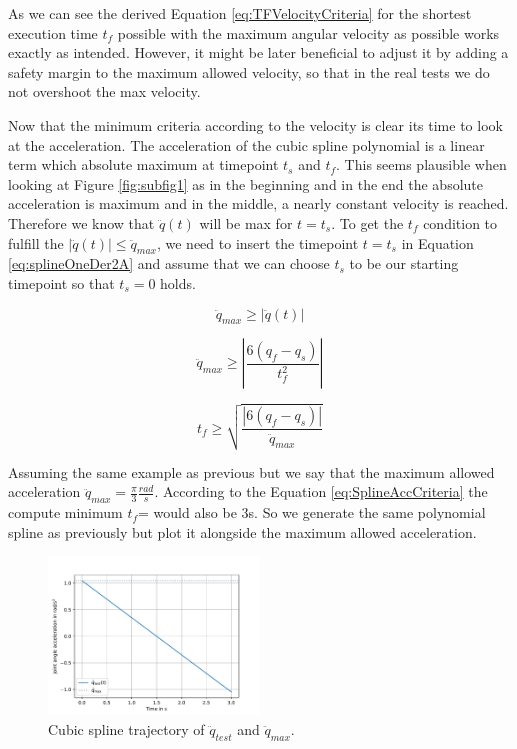 As we can see the derived Equation \ref{eq:TFVelocityCriteria} for the shortest execution time $t_f$ possible with the maximum angular velocity as possible works exactly as intended. However, it might be later beneficial to adjust it by adding a safety margin to the maximum allowed velocity, so that in the real tests we do not overshoot the max velocity. 
\newline

Now that the minimum criteria according to the velocity is clear its time to look at the acceleration. The acceleration of the cubic spline polynomial is a linear term which absolute maximum at timepoint $t_s$ and $t_f$. This seems plausible when looking at Figure \ref{fig:subfig1} as in the beginning and in the end the absolute acceleration is maximum and in the middle, a nearly constant velocity is reached. Therefore we know that $\ddot{q}(t)$ will be max for $t=t_s$. To get the $t_f$ condition to fulfill the $|\ddot{q}(t)| \leq \ddot{q}_{max}$, we need to insert the timepoint $t=t_s$ in Equation \ref{eq:splineOneDer2A} and assume that we can choose $t_s$ to be our starting timepoint so that $t_s=0$ holds.

\begin{equation}
    \ddot{q}_{max} \geq  |\ddot{q}(t)|
\end{equation}

\begin{equation}
    \ddot{q}_{max} \geq |\frac{6(q_{f}-q_{s})}{t_{f}^2}|
    \label{eq:splineOneDerAtMax}
\end{equation}

\begin{equation}
    t_f \geq \sqrt{\frac{|6(q_{f}-q_{s})|}{\ddot{q}_{max}}}
    \label{eq:SplineAccCriteria}
\end{equation}

Assuming the same example as previous but we say that the maximum allowed acceleration $\ddot{q}_{max}=\frac{\pi}{3}\frac{rad}{s}$. According to the Equation \ref{eq:SplineAccCriteria} the compute minimum $t_f$= would also be 3s. So we generate the same polynomial spline as previously but plot it alongside the maximum allowed acceleration.

\begin{figure} [H]
   \begin{center}
        \includegraphics[width=0.5\textwidth]{SRC/SplineExampleAcceleration.pdf}
   \end{center}
  \caption{Cubic spline trajectory of $\ddot{q}_{test}$ and $\ddot{q}_{max}$.}
  \label{fig:AcceSpline}
\end{figure}

